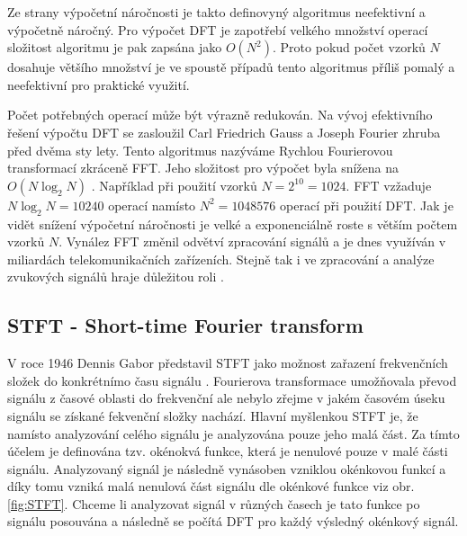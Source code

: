   Ze strany výpočetní náročnosti je takto definovyný algoritmus neefektivní a výpočetně náročný.
  Pro výpočet \acs{DFT} je zapotřebí velkého množství operací složitost algoritmu je pak zapsána jako $O(N^2)$.
  Proto pokud počet vzorků $N$ dosahuje většího množství je ve spoustě případů tento algoritmus příliš pomalý a neefektivní pro praktické využití.

  Počet potřebných operací může být výrazně redukován. 
  Na vývoj efektivního řešení výpočtu \acs{DFT} se zasloužil Carl Friedrich Gauss a Joseph Fourier zhruba před dvěma sty lety. Tento algoritmus nazýváme Rychlou Fourierovou transformací zkráceně FFT.
  Jeho složitost pro výpočet byla snížena na $O(N \log_2 N)$ \cite{fundamental_of_music_processing}.
  Například při použití vzorků $N = 2^{10} = 1024$. \acs{FFT} vzžaduje $N\log_2N = 10240 $ operací namísto $N^2 = 1048576$ operací při použití \acs{DFT}. Jak je vidět snížení výpočetní náročnosti je velké a exponenciálně roste s větším počtem vzorků $N$.
  Vynález \acs{FFT} změnil odvětví zpracování signálů a je dnes využíván v miliardách telekomunikačních zařízeních. Stejně tak i ve zpracování a analýze zvukových signálů hraje důležitou roli \cite{fundamental_of_music_processing}.
  
  \subsection{STFT - Short-time Fourier transform} \label{sec:STFT}

  V roce 1946 Dennis Gabor představil \acs{STFT} jako možnost zařazení frekvenčních složek do konkrétnímo času signálu \cite{strichartz2003guide}.
  Fourierova transformace umožňovala převod signálu z časové oblasti do frekvenční ale nebylo zřejme v jakém časovém úseku signálu se získané fekvenční složky nachází.
  Hlavní myšlenkou \acs{STFT} je, že namísto analyzování celého signálu je analyzována pouze jeho malá část.
  Za tímto účelem je definována tzv. okénokvá funkce, která je nenulové pouze v malé části signálu.
  Analyzovaný signál je následně vynásoben vzniklou okénkovou funkcí a díky tomu vzniká malá nenulová část signálu dle okénkové funkce viz obr. \ref{fig:STFT}.
  Chceme li analyzovat signál v různých časech je tato funkce po signálu posouvána a následně se počítá \acs{DFT} pro každý výsledný okénkový signál.

